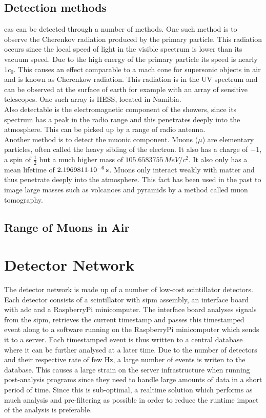 \documentclass[abstract,toc,los,english,11pt,glossaries]{jluthesis}
\begin{document}
\subsection{Detection methods}
\acrshort{eas} can be detected through a number of methods. One such method is to observe the Cherenkov radiation produced by the primary particle. This radiation occurs since the local speed of light in the visible spectrum is lower than its vacuum speed. Due to the high energy of the primary particle its speed is nearly $1c_0$. This causes an effect comparable to a mach cone for supersonic objects in air and is known as Cherenkow radiation. This radiation is in the UV spectrum and can be observed at the surface of earth for example with an array of sensitive telescopes. One such array is HESS, located in Namibia. \\
Also detectable is the electromagnetic component of the showers, since its spectrum has a peak in the radio range and this penetrates deeply into the atmosphere. This can be picked up by a range of radio antenna. \\
Another method is to detect the muonic component. Muons ($\mu$) are elementary particles, often called the heavy sibling of the electron. It also has a charge of $-1$, a spin of $\frac{1}{2}$ but a much higher mass of
$105.6583755\,\si{MeV/c^2}$. It also only has a mean lifetime of $\snsi{2.1969811}{-6}{s}$. Muons only interact weakly with matter and thus penetrate deeply into the atmosphere. This fact has been used in the past to image large masses such as volcanoes and pyramids by a method called muon tomography.
\subsection{Range of Muons in Air}
\section{Detector Network}
The detector network is made up of a number of low-cost scintillator detectors. Each detector consists of a scintillator with \acrfull{sipm} assembly, an interface board with \acrfull{adc} and a RaspberryPi minicomputer. The interface board analyses signals from the \acrshort{sipm}, retrieves the current timestamp and passes this timestamped event along to a software running on the RaspberryPi minicomputer which sends it to a server. Each timestamped event is thus written to a central database where it can be further analysed at a later time. Due to the number of detectors and their respective rate of few Hz, a large number of events is writen to the database. This causes a large strain on the server infrastructure when running post-analysis programs since they need to handle large amounts of data in a short period of time. Since this is sub-optimal, a realtime solution which performs as much analysis and pre-filtering as possible in order to reduce the runtime impact of the analysis is preferable.
\end{document}
